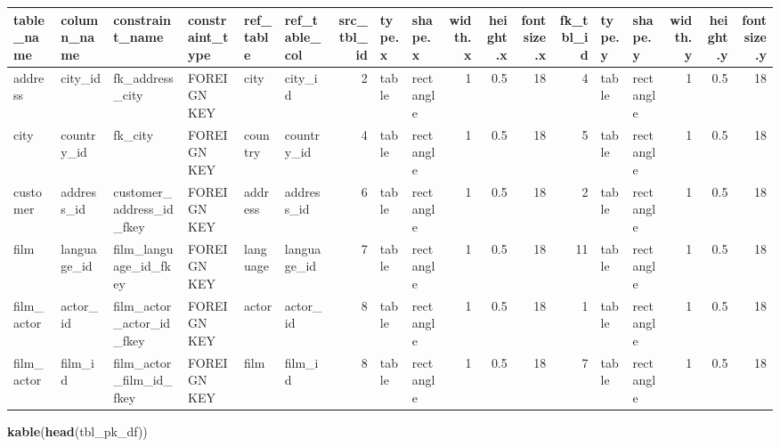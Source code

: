 \documentclass[]{book}
\newenvironment{Shaded}{\begin{snugshade}}{\end{snugshade}}
\newcommand{\KeywordTok}[1]{\textcolor[rgb]{0.13,0.29,0.53}{\textbf{#1}}}
\newcommand{\NormalTok}[1]{#1}
\theoremstyle{definition}
\theoremstyle{definition}
\theoremstyle{definition}
\theoremstyle{remark}
\begin{document}
\begin{tabular}{l|l|l|l|l|l|r|l|l|r|r|r|r|l|l|r|r|r}
\hline
table\_name & column\_name & constraint\_name & constraint\_type & ref\_table & ref\_table\_col & src\_tbl\_id & type.x & shape.x & width.x & height.x & fontsize.x & fk\_tbl\_id & type.y & shape.y & width.y & height.y & fontsize.y\\
\hline
address & city\_id & fk\_address\_city & FOREIGN KEY & city & city\_id & 2 & table & rectangle & 1 & 0.5 & 18 & 4 & table & rectangle & 1 & 0.5 & 18\\
\hline
city & country\_id & fk\_city & FOREIGN KEY & country & country\_id & 4 & table & rectangle & 1 & 0.5 & 18 & 5 & table & rectangle & 1 & 0.5 & 18\\
\hline
customer & address\_id & customer\_address\_id\_fkey & FOREIGN KEY & address & address\_id & 6 & table & rectangle & 1 & 0.5 & 18 & 2 & table & rectangle & 1 & 0.5 & 18\\
\hline
film & language\_id & film\_language\_id\_fkey & FOREIGN KEY & language & language\_id & 7 & table & rectangle & 1 & 0.5 & 18 & 11 & table & rectangle & 1 & 0.5 & 18\\
\hline
film\_actor & actor\_id & film\_actor\_actor\_id\_fkey & FOREIGN KEY & actor & actor\_id & 8 & table & rectangle & 1 & 0.5 & 18 & 1 & table & rectangle & 1 & 0.5 & 18\\
\hline
film\_actor & film\_id & film\_actor\_film\_id\_fkey & FOREIGN KEY & film & film\_id & 8 & table & rectangle & 1 & 0.5 & 18 & 7 & table & rectangle & 1 & 0.5 & 18\\
\hline
\end{tabular}

\begin{Shaded}
\begin{Highlighting}[]
\KeywordTok{kable}\NormalTok{(}\KeywordTok{head}\NormalTok{(tbl_pk_df))}
\end{Highlighting}
\end{Shaded}
\end{document}
